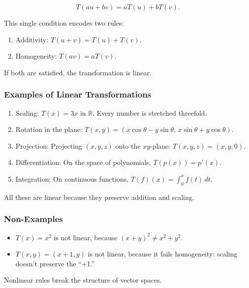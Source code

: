 \documentclass[
  letterpaper,
  DIV=11,
  numbers=noendperiod]{scrreprt}
\providecommand{\tightlist}{%
  \setlength{\itemsep}{0pt}\setlength{\parskip}{0pt}}
\begin{document}
\[
T(au + bv) = aT(u) + bT(v).
\]

This single condition encodes two rules:

\begin{enumerate}
\def\labelenumi{\arabic{enumi}.}
\tightlist
\item
  Additivity: \(T(u+v) = T(u) + T(v)\).
\item
  Homogeneity: \(T(av) = aT(v)\).
\end{enumerate}

If both are satisfied, the transformation is linear.

\subsubsection{Examples of Linear
Transformations}\label{examples-of-linear-transformations}

\begin{enumerate}
\def\labelenumi{\arabic{enumi}.}
\item
  Scaling: \(T(x) = 3x\) in \(\mathbb{R}\). Every number is stretched
  threefold.
\item
  Rotation in the plane:
  \(T(x,y) = (x\cos\theta - y\sin\theta, \, x\sin\theta + y\cos\theta)\).
\item
  Projection: Projecting \((x,y,z)\) onto the \(xy\)-plane:
  \(T(x,y,z) = (x,y,0)\).
\item
  Differentiation: On the space of polynomials, \(T(p(x)) = p'(x)\).
\item
  Integration: On continuous functions,
  \(T(f)(x) = \int_0^x f(t) \, dt\).
\end{enumerate}

All these are linear because they preserve addition and scaling.

\subsubsection{Non-Examples}\label{non-examples-1}

\begin{itemize}
\tightlist
\item
  \(T(x) = x^2\) is not linear, because \((x+y)^2 \neq x^2 + y^2\).
\item
  \(T(x,y) = (x+1, y)\) is not linear, because it fails homogeneity:
  scaling doesn't preserve the ``+1.''
\end{itemize}

Nonlinear rules break the structure of vector spaces.
\end{document}
